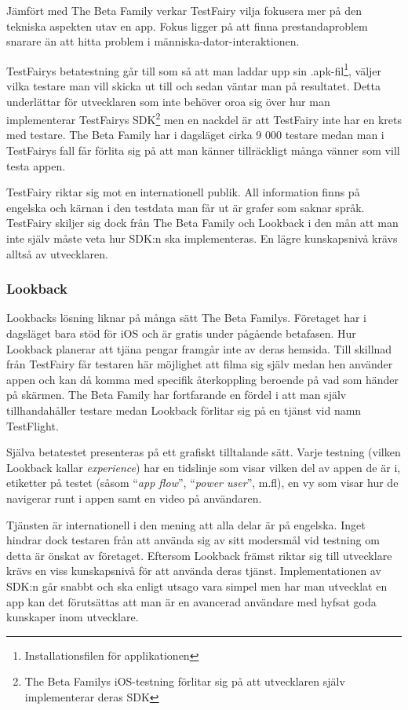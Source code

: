 Jämfört med The Beta Family verkar TestFairy vilja fokusera mer på den tekniska aspekten utav en app. Fokus ligger på att finna  prestandaproblem snarare än att hitta problem i människa-dator-interaktionen. 

TestFairys betatestning går till som så att man laddar upp sin .apk-fil\footnote{Installationsfilen för applikationen}, väljer vilka testare man vill skicka ut till och sedan väntar man på resultatet. Detta underlättar för utvecklaren som inte behöver oroa sig över hur man implementerar TestFairys SDK\footnote{The Beta Familys iOS-testning förlitar sig på att utvecklaren själv implementerar deras SDK} men en nackdel är att TestFairy inte har en krets med testare. The Beta Family har i dagsläget cirka 9 000 testare medan man i TestFairys fall får förlita sig på att man känner tillräckligt många vänner som vill testa appen.

TestFairy riktar sig mot en internationell publik. All information finns på engelska och kärnan i den testdata man får ut är grafer som saknar språk. TestFairy skiljer sig dock från The Beta Family och Lookback i den mån att man inte själv måste veta hur SDK:n ska implementeras. En lägre kunskapsnivå krävs alltså av utvecklaren.

\subsubsection{Lookback}
\label{lookback}
Lookbacks lösning liknar på många sätt The Beta Familys. Företaget har i dagsläget bara stöd för iOS och är gratis under pågående betafasen\parencite{lookback}. Hur Lookback planerar att tjäna pengar framgår inte av deras hemsida. Till skillnad från TestFairy får testaren här möjlighet att filma sig själv medan hen använder appen och kan då komma med specifik återkoppling beroende på vad som händer på skärmen. The Beta Family har fortfarande en fördel i att man själv tillhandahåller testare medan Lookback förlitar sig på en tjänst vid namn TestFlight.

Själva betatestet presenteras på ett grafiskt tilltalande sätt. Varje testning (vilken Lookback kallar \emph{experience}) har en tidslinje som visar vilken del av appen de är i, etiketter på testet (såsom ``\emph{app flow}'', ``\emph{power user}'', m.fl), en vy som visar hur de navigerar runt i appen samt en video på användaren. 

Tjänsten är internationell i den mening att alla delar är på engelska. Inget hindrar dock testaren från att använda sig av sitt modersmål vid testning om detta är önskat av företaget. Eftersom Lookback främst riktar sig till utvecklare krävs en viss kunskapsnivå för att använda deras tjänst. Implementationen av SDK:n går snabbt och ska enligt utsago vara simpel men har man utvecklat en app kan det förutsättas att man är en avancerad användare med hyfsat goda kunskaper inom utvecklare.

